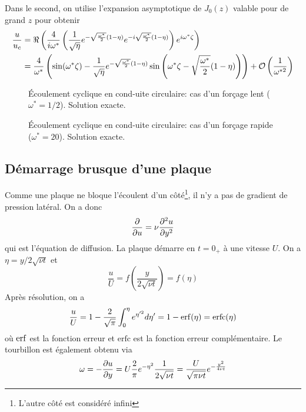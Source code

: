 \documentclass[a4paper,11pt]{report}
\newcommand{\recip}[1]{\frac{1}{#1}}
\newcommand{\erfc}[0]{\textrm{erfc}}
\begin{document}
      Dans le second, on utilise l'expansion asymptotique de $J_0(z)$ valable pour de grand $z$ pour obtenir
      \begin{equation}
        \begin{aligned}
          \frac{u}{u_c} &= \real \left(\frac{4}{i\omega^\ast}\left( \recip{\sqrt{\eta}}e^{-\sqrt{\frac{\omega^\ast}{2}}(1-\eta)} e^{-i \sqrt{\frac{\omega^\ast}{2}}(1-\eta)}\right)
          e^{i\omega^\ast \zeta}\right)\\
          &= \frac{4}{\omega^\ast} \left(\sin(\omega^\ast \zeta) - \recip{\sqrt{\eta}}e^{-\sqrt{\frac{\omega^\ast}{2}}(1-\eta)}\sin\left(\omega^\ast \zeta -\sqrt{\frac{\omega^\ast}{2}}(1-\eta) \right)
          \right) + \mathcal{O}\left(\recip{\omega^{\ast 2}}\right)
        \end{aligned}
      \end{equation}
      \begin{figure}[h]
        \centering
        \begin{minipage}[c]{0.45\textwidth}
          
          \caption{Écoulement cyclique en cond-uite circulaire: cas d'un forçage lent ($\omega^\ast = 1/2$). Solution exacte.}
          \label{fig:forcageLent}
        \end{minipage}
        \begin{minipage}[c]{0.45\textwidth}
          
          \caption{Écoulement cyclique en cond-uite circulaire: cas d'un forçage rapide ($\omega^\ast = 20$). Solution exacte.}
          \label{fig:forcageRapide}
        \end{minipage}
      \end{figure}

    \subsection{Démarrage brusque d'une plaque}
      Comme une plaque ne bloque l'écoulent d'un côté\footnote{L'autre côté est considéré infini}, il n'y a pas de gradient de pression latéral. On a donc
      \begin{equation}
        \pdv{u} = \nu \pdv[2]{u}{y}
      \end{equation}
      qui est l'équation de diffusion. La plaque démarre en $t=0_+$ à une vitesse $U$. On a $\eta = y/2\sqrt{\nu t}$ et
      \begin{equation}
        \frac{u}{U} = f\left(\frac{y}{2\sqrt{\nu t}}\right) = f(\eta)
      \end{equation}
      Après résolution,  on a
      \begin{equation}
        \frac{u}{U} = 1 - \frac{2}{\sqrt{\pi}}\int_0^\eta e^{\eta'^2} d\eta'  = 1-\erf(\eta) = \erfc(\eta)
      \end{equation}
      où $\erf$ est la fonction erreur et $\erfc$ est la fonction erreur complémentaire.
      Le tourbillon est également obtenu via
      \begin{equation}
        \omega = -\pdv{u}{y} = U \frac{2}{\pi} e^{-\eta^2} \frac{1}{2\sqrt{\nu t}} = \frac{U}{\sqrt{\pi\nu t}}e^{-\frac{y^2}{4\nu t}}
      \end{equation}
\end{document}
